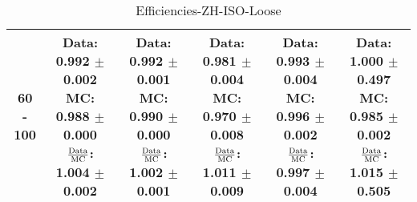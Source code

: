 \documentclass[final,letterpaper,twoside,12pt]{article}
\begin{document}
\begin{table}[htbp]
\begin{adjustwidth}{-4em}{-4em}
\begin{tabular}{|c|c|c|c|c|c|}
60 - 100 & \parbox[c]{1.1 in}{ \scriptsize  Data: 0.992 $\pm$ 0.002 \newline MC: 0.988 $\pm$ 0.000 \newline $\frac{\rm{Data}}{\rm{MC}}$: 1.004 $\pm$ 0.002} & \parbox[c]{1.1 in}{ \scriptsize  Data: 0.992 $\pm$ 0.001 \newline MC: 0.990 $\pm$ 0.000 \newline $\frac{\rm{Data}}{\rm{MC}}$: 1.002 $\pm$ 0.001} & \parbox[c]{1.1 in}{ \scriptsize  Data: 0.981 $\pm$ 0.004 \newline MC: 0.970 $\pm$ 0.008 \newline $\frac{\rm{Data}}{\rm{MC}}$: 1.011 $\pm$ 0.009} & \parbox[c]{1.1 in}{ \scriptsize  Data: 0.993 $\pm$ 0.004 \newline MC: 0.996 $\pm$ 0.002 \newline $\frac{\rm{Data}}{\rm{MC}}$: 0.997 $\pm$ 0.004} & \parbox[c]{1.1 in}{ \scriptsize  Data: 1.000 $\pm$ 0.497 \newline MC: 0.985 $\pm$ 0.002 \newline $\frac{\rm{Data}}{\rm{MC}}$: 1.015 $\pm$ 0.505}\\ \hline 
\end{tabular}
\caption {Efficiencies-ZH-ISO-Loose}
\label{tab:cqdata0}
\end{adjustwidth}\end{table}
\end{document}
